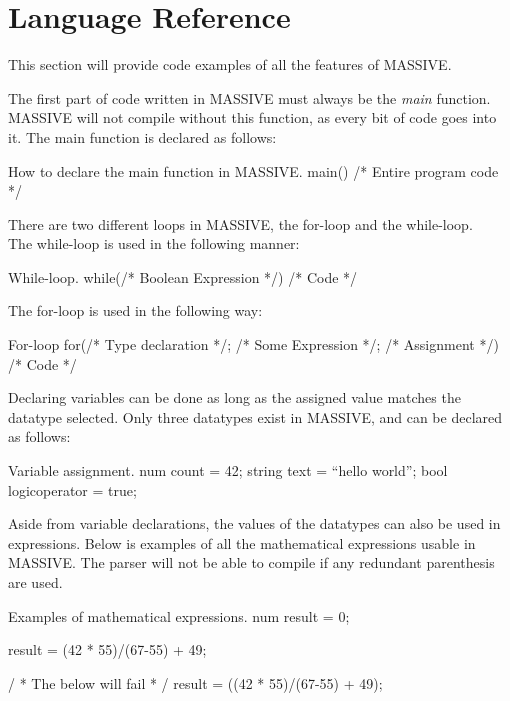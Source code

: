 \section{Language Reference}
\label{sec:language_reference}

This section will provide code examples of all the features of MASSIVE.

The first part of code written in MASSIVE must always be the \textit{main} function. MASSIVE will not compile without this function, as every bit of code goes into it.
The main function is declared as follows:

\begin{source}{How to declare the main function in MASSIVE.}{}
main()
{
		/* Entire program code */
}
\end{source}

There are two different loops in MASSIVE, the for-loop and the while-loop.\\
The while-loop is used in the following manner:
\begin{source}{While-loop.}{}
while(/* Boolean Expression */)
{
		/* Code */
}
\end{source}

The for-loop is used in the following way:
\begin{source}{For-loop}{}
for(/* Type declaration */; /* Some Expression */; /* Assignment */)
{
		/* Code */
}
\end{source}

Declaring variables can be done as long as the assigned value matches the datatype selected. Only three datatypes exist in MASSIVE, and can be declared as follows:

\begin{source}{Variable assignment.}{}
num count = 42;
string text = ``hello world'';
bool logicoperator = true;
\end{source}

Aside from variable declarations, the values of the datatypes can also be used in expressions. Below is examples of all the mathematical expressions usable in MASSIVE. The parser will not be able to compile if any redundant parenthesis are used.

\begin{source}{Examples of mathematical expressions.}{}
num result = 0;

result = (42 * 55)/(67-55) + 49;

/ * The below will fail * /
result = ((42 * 55)/(67-55) + 49);

\end{source}

